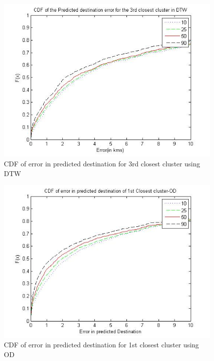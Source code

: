 \begin{figure}
\centering   
\includegraphics[scale=0.4]{figs/dtw_top3.jpg}
\caption{CDF of error in predicted destination for 3rd closest cluster using DTW}
\label{fig:dtw_top3}  
\end{figure}


\begin{figure}
\centering   
\includegraphics[scale=0.4]{figs/od_top.jpg}
\caption{CDF of error in predicted destination for 1st closest cluster using OD}
\label{fig:od_top}  
\end{figure}

